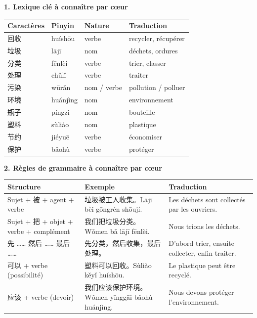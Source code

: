\documentclass[11pt]{article}
\begin{document}
\begin{bilan}
\textbf{1. Lexique clé à connaître par cœur}
\begin{center}
\begin{tabularx}{\linewidth}{|X|X|X|X|}
\hline
\rowcolor{popblueL} Caractères & Pinyin & Nature & Traduction \\
\hline
回收 & huíshōu & verbe & recycler, récupérer \\
\hline
垃圾 & lājī & nom & déchets, ordures \\
\hline
分类 & fēnlèi & verbe & trier, classer \\
\hline
处理 & chǔlǐ & verbe & traiter \\
\hline
污染 & wūrǎn & nom / verbe & pollution / polluer \\
\hline
环境 & huánjìng & nom & environnement \\
\hline
瓶子 & píngzi & nom & bouteille \\
\hline
塑料 & sùliào & nom & plastique \\
\hline
节约 & jiéyuē & verbe & économiser \\
\hline
保护 & bǎohù & verbe & protéger \\
\hline
\end{tabularx}
\end{center}

\textbf{2. Règles de grammaire à connaître par cœur}
\begin{center}
\begin{tabularx}{\linewidth}{|X|X|X|}
\hline
\rowcolor{popblueL} Structure & Exemple & Traduction \\
\hline
Sujet + 被 + agent + verbe & 垃圾被工人收集。Lājī bèi gōngrén shōují. & Les déchets sont collectés par les ouvriers. \\
\hline
Sujet + 把 + objet + verbe + complément & 我们把垃圾分类。Wǒmen bǎ lājī fēnlèi. & Nous trions les déchets. \\
\hline
先 …… 然后 …… 最后 …… & 先分类，然后收集，最后处理。 & D'abord trier, ensuite collecter, enfin traiter. \\
\hline
可以 + verbe (possibilité) & 塑料可以回收。Sùliào kěyǐ huíshōu. & Le plastique peut être recyclé. \\
\hline
应该 + verbe (devoir) & 我们应该保护环境。Wǒmen yīnggāi bǎohù huánjìng. & Nous devons protéger l'environnement. \\
\hline
\end{tabularx}
\end{center}


\end{bilan}
\end{document}
